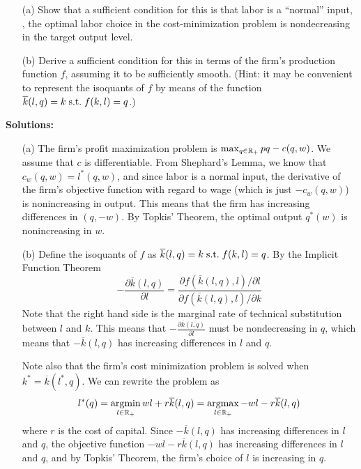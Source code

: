 \documentclass[12pt]{article}
\begin{document}
\begin{itemize}
    \item[(a)] Show that a sufficient condition for this is that labor is a ``normal'' input, \ie, the optimal labor choice in the cost-minimization problem is nondecreasing in the target output level.

    \item[(b)] Derive a sufficient condition for this in terms of the firm's production function $f$, assuming it to be sufficiently smooth. (Hint: it may be convenient to represent the isoquants of $f$ by means of the function $\overline{k}(l,q) = k \;\text{s.t.}\; f(k,l) = q$.)
\end{itemize}

\medskip

\textbf{Solutions:}

\begin{itemize}
    \item[(a)] The firm's profit maximization problem is $\max_{q \in \mathbb{R}_+} pq - c(q,w)$. We assume that $c$ is differentiable. From Shephard's Lemma, we know that $c_w(q,w) = l^*(q,w)$, and since labor is a normal input, the derivative of the firm's objective function with regard to wage (which is just $-c_w(q,w)$) is nonincreasing in output. This means that the firm has increasing differences in $(q,-w)$. By Topkis' Theorem, the optimal output $q^*(w)$ is nonincreasing in $w$.

    \item[(b)] Define the isoquants of $f$ as $\overline{k}(l,q) = k \;\text{s.t.}\; f(k,l) = q$. By the Implicit Function Theorem
    \[
    -\frac{\partial \overline{k}(l,q)}{\partial l} = \frac{\partial f( \overline{k}(l,q),l) / \partial l}{\partial f( \overline{k}(l,q),l) / \partial k}
    \]
    Note that the right hand side is the marginal rate of technical substitution between $l$ and $k$. This means that $-\frac{\partial \overline{k}(l,q)}{\partial l}$ must be nondecreasing in $q$, which means that $-\overline{k}(l,q)$ has increasing differences in $l$ and $q$.

    Note also that the firm's cost minimization problem is solved when $k^* = \overline{k}(l^*,q)$. We can rewrite the problem as
    \[
    l^*(q) = \mathop{\rm argmin}_{l \in \mathbb{R}_+} wl + r\overline{k}(l,q) = \mathop{\rm argmax}_{l \in \mathbb{R}_+} -wl - r\overline{k}(l,q)
    \]
    where $r$ is the cost of capital. Since $-\overline{k}(l,q)$ has increasing differences in $l$ and $q$, the objective function $-wl - r\overline{k}(l,q)$ has increasing differences in $l$ and $q$, and by Topkis' Theorem, the firm's choice of $l$ is increasing in $q$.
\end{itemize}
\end{document}
